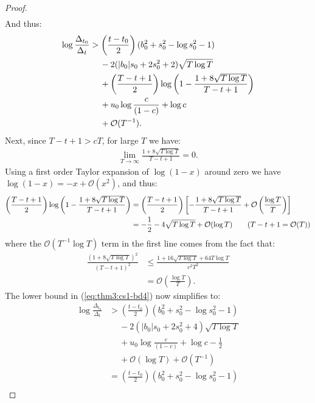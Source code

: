 \begin{proof}
\begin{align*}
\end{align*}
And thus:
\begin{align}
    \log \frac{\Delta_{t_0}}{\Delta_t} &> \left(\frac{t-t_0}{2}\right)(b_0^2 + s_0^2 - \log s_0^2 - 1) \notag \\
    &\quad\: - 2 (|b_0|s_0 +2s_0^2 + 2) \sqrt{T \log T}  \notag\\
    &\quad\: + \left(\frac{T - t+1}{2}\right)\log\left(1 - \frac{1 + 8\sqrt{T \log T}}{T-t+1}\right)  \notag\\
    &\quad\: + u_0\log \frac{c}{(1-c)} + \log c \notag \\
    &\quad\: + \mathcal{O}(T^{-1}). \label{eq:thm3:cs1-bd4}
\end{align}
Next, since $T-t + 1 > cT$, for large $T$ we have:
\begin{align*}
    \lim_{T\to \infty} \frac{1 + 8\sqrt{T \log T}}{T-t+1} = 0.
\end{align*}
Using a first order Taylor expansion of $\log(1-x)$ around zero we have $\log(1-x) = -x + \mathcal{O}(x^2)$, and thus:
\begin{align*}
    \left(\frac{T - t+1}{2}\right)\log\left(1 - \frac{1 + 8\sqrt{T \log T}}{T-t+1}\right) &= \left(\frac{T - t+1}{2}\right)\left[-\frac{1 + 8\sqrt{T \log T}}{T-t+1} + \mathcal{O} \left(\frac{\log T}{T}\right)\right] \\
    &= -\frac{1}{2} - 4 \sqrt{T\log T} + \mathcal{O}(\log T) \tag{$T-t+1 = \mathcal{O}(T)$}
\end{align*}
where the $\mathcal{O} \left(T^{-1}\log T\right)$ term in the first line comes from the fact that:
\begin{align*}
    \frac{(1 + 8\sqrt{T \log T})^2}{(T-t+1)^2} &\leq \frac{1 + 16\sqrt{T\log T} + 64 T\log T}{c^2T^2} \tag{$T-t+1 > cT$} \\
    &= \mathcal{O} \left(\frac{\log T}{T}\right).
\end{align*}
The lower bound in (\ref{eq:thm3:cs1-bd4}) now simplifies to: 
\begin{align*}
    \log \frac{\Delta_{t_0}}{\Delta_t} &> \left(\frac{t-t_0}{2}\right)(b_0^2 + s_0^2 - \log s_0^2 - 1) \\
    &\quad\: - 2 \left(|b_0|s_0 +2s_0^2 + 4\right) \sqrt{T \log T} \\
    &\quad\: + u_0\log \frac{c}{(1-c)} + \log c - \frac{1}{2} \\
    &\quad\: + \mathcal{O}(\log T) + \mathcal{O}(T^{-1}) \\
    &= \left(\frac{t-t_0}{2}\right)(b_0^2 + s_0^2 - \log s_0^2 - 1) \\

\end{align*}
\end{proof}
